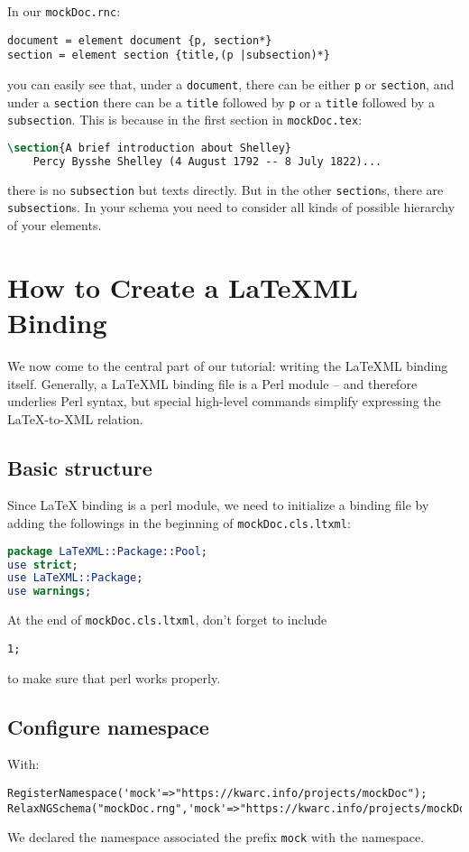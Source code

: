 \documentclass[a4paper]{article}
\def\latexml{{\LaTeX}ML\xspace}
\begin{document}
 In our \lstinline|mockDoc.rnc|:
\begin{lstlisting}
document = element document {p, section*}
section = element section {title,(p |subsection)*}
\end{lstlisting}
you can easily see that, under a \lstinline|document|, there can be either \lstinline|p| or \lstinline|section|, and under a \lstinline|section| there can be a \lstinline|title| followed by \lstinline|p| or a \lstinline|title| followed by a \lstinline|subsection|. This is because in the first section in \lstinline|mockDoc.tex|:
\begin{lstlisting}[language=TeX]
\section{A brief introduction about Shelley}
    Percy Bysshe Shelley (4 August 1792 -- 8 July 1822)...
\end{lstlisting}
there is no \lstinline|subsection| but texts directly. But in the other \lstinline|section|s, there are \lstinline|subsection|s. In your schema you need to consider all kinds of possible hierarchy of your elements.



\section{How to Create a \latexml Binding}
We now come to the central part of our tutorial: writing the \latexml binding
itself. Generally, a \latexml binding file is a Perl module -- and therefore underlies
Perl syntax, but special high-level commands simplify expressing the {\LaTeX}-to-XML
relation.

\subsection{Basic structure}
Since {\LaTeX} binding is a perl module, we need to initialize a binding file by adding
the followings in the beginning of \lstinline|mockDoc.cls.ltxml|:
\begin{lstlisting}[language=Perl]
package LaTeXML::Package::Pool;
use strict;
use LaTeXML::Package;
use warnings;
\end{lstlisting}
At the end of \lstinline|mockDoc.cls.ltxml|, don't forget to include
\begin{lstlisting}
1;
\end{lstlisting}
to make sure that perl works properly.

\subsection{Configure namespace}
 With:
\begin{lstlisting}
RegisterNamespace('mock'=>"https://kwarc.info/projects/mockDoc");
RelaxNGSchema("mockDoc.rng",'mock'=>"https://kwarc.info/projects/mockDoc");
\end{lstlisting}
 We declared the namespace associated the prefix \lstinline|mock| with the
 namespace.
\end{document}
